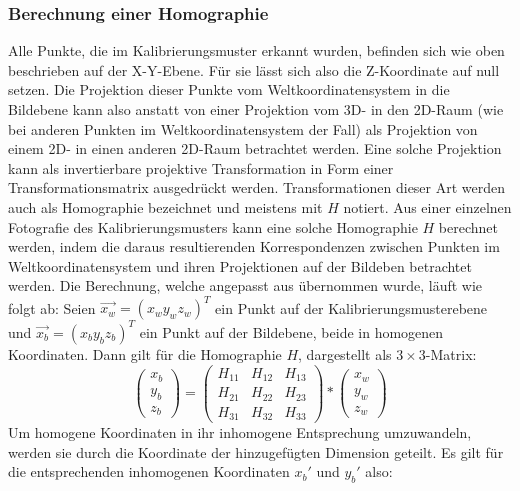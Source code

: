 \newpage

\subsubsection{Berechnung einer Homographie}
Alle Punkte, die im Kalibrierungsmuster erkannt wurden, befinden sich wie oben beschrieben auf der X-Y-Ebene. Für sie lässt sich also die Z-Koordinate auf null setzen. Die Projektion dieser Punkte vom Weltkoordinatensystem in die Bildebene kann also anstatt von einer Projektion vom 3D- in den 2D-Raum (wie bei anderen Punkten im Weltkoordinatensystem der Fall) als Projektion von einem 2D- in einen anderen 2D-Raum betrachtet werden. Eine solche Projektion kann als invertierbare projektive Transformation in Form einer Transformationsmatrix ausgedrückt werden. Transformationen dieser Art werden auch als Homographie bezeichnet und meistens mit \(H\) notiert. Aus einer einzelnen Fotografie des Kalibrierungsmusters kann eine solche Homographie \(H\) berechnet werden, indem die daraus resultierenden Korrespondenzen zwischen Punkten im Weltkoordinatensystem und ihren Projektionen auf der Bildeben betrachtet werden. Die Berechnung, welche angepasst aus \cite{Kriegman:07} übernommen wurde, läuft wie folgt ab:
\newline
Seien \(\vec{x_w} = \left(x_w y_w z_w\right)^{T}\) ein Punkt auf der Kalibrierungsmusterebene und \(\vec{x_b} = \left(x_b y_b z_b\right)^{T}\) ein Punkt auf der Bildebene, beide in homogenen Koordinaten. Dann gilt für die Homographie \(H\), dargestellt als \(3\times 3\)-Matrix:
\begin{equation}
\label{equ:homographie1}
	\left(\begin{array}{c}x_b\\y_b\\z_b\end{array}\right) =  \begin{pmatrix}
			H_{11} & H_{12} & H_{13} \\
			H_{21} & H_{22} & H_{23} \\
			H_{31} & H_{32} & H_{33}
		\end{pmatrix} * \left(\begin{array}{c}x_w\\y_w\\z_w\end{array}\right)
\end{equation}
Um homogene Koordinaten in ihr inhomogene Entsprechung umzuwandeln, werden sie durch die Koordinate der hinzugefügten Dimension geteilt. Es gilt für die entsprechenden inhomogenen Koordinaten \(x_b\prime\) und \(y_b\prime\) also:
